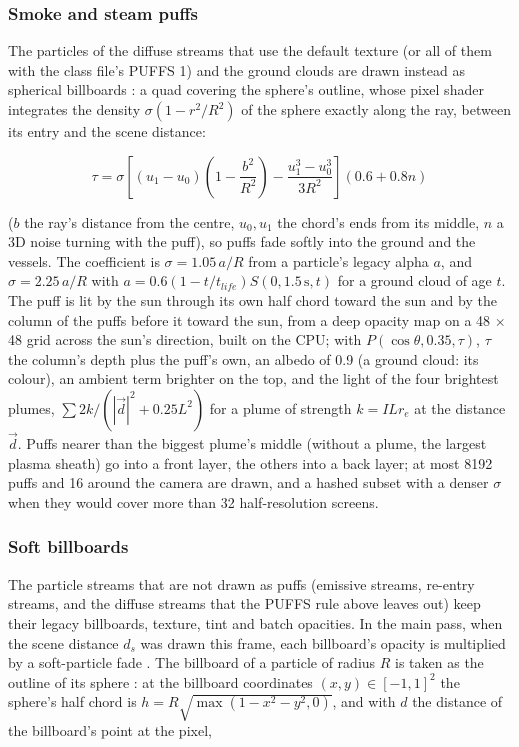 \documentclass[Orbiter Technical Reference.tex]{subfiles}
\begin{document}
\begin{sloppypar}
\subsubsection{Smoke and steam puffs}
The particles of the diffuse streams that use the default texture (or all of them with the class file's PUFFS 1) and the ground clouds are drawn instead as spherical billboards \cite{umenhoffer2006}: a quad covering the sphere's outline, whose pixel shader integrates the density $\sigma(1 - r^{2}/R^{2})$ of the sphere exactly along the ray, between its entry and the scene distance:

\[ \tau = \sigma\left[ (u_{1} - u_{0})\left(1 - \frac{b^{2}}{R^{2}}\right) - \frac{u_{1}^{3} - u_{0}^{3}}{3R^{2}} \right](0.6 + 0.8n) \]

\noindent
($b$ the ray's distance from the centre, $u_{0}, u_{1}$ the chord's ends from its middle, $n$ a 3D noise turning with the puff), so puffs fade softly into the ground and the vessels. The coefficient is $\sigma = 1.05\,a/R$ from a particle's legacy alpha $a$, and $\sigma = 2.25\,a/R$ with $a = 0.6(1 - t/t_{life})S(0, 1.5\,\mathrm{s}, t)$ for a ground cloud of age $t$. The puff is lit by the sun through its own half chord toward the sun and by the column of the puffs before it toward the sun, from a deep opacity map \cite{kim2001} on a 48 $\times$ 48 grid across the sun's direction, built on the CPU; with $P(\cos\theta, 0.35, \tau)$, $\tau$ the column's depth plus the puff's own, an albedo of 0.9 (a ground cloud: its colour), an ambient term brighter on the top, and the light of the four brightest plumes, $\sum 2k/(|\vec{d}|^{2} + 0.25L^{2})$ for a plume of strength $k = IL r_{e}$ at the distance $\vec{d}$. Puffs nearer than the biggest plume's middle (without a plume, the largest plasma sheath) go into a front layer, the others into a back layer; at most 8192 puffs and 16 around the camera are drawn, and a hashed subset with a denser $\sigma$ when they would cover more than 32 half-resolution screens.

\subsubsection{Soft billboards}
The particle streams that are not drawn as puffs (emissive streams, re-entry streams, and the diffuse streams that the PUFFS rule above leaves out) keep their legacy billboards, texture, tint and batch opacities. In the main pass, when the scene distance $d_{s}$ was drawn this frame, each billboard's opacity is multiplied by a soft-particle fade \cite{lorach2007}. The billboard of a particle of radius $R$ is taken as the outline of its sphere \cite{umenhoffer2006}: at the billboard coordinates $(x, y) \in [-1, 1]^{2}$ the sphere's half chord is $h = R\sqrt{\max(1 - x^{2} - y^{2}, 0)}$, and with $d$ the distance of the billboard's point at the pixel,


\end{sloppypar}
\end{document}
